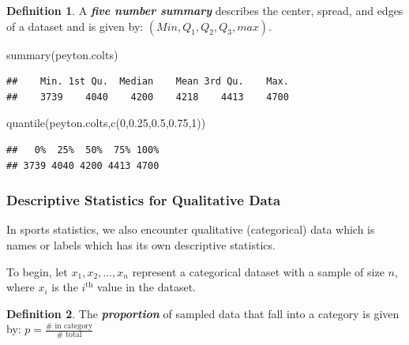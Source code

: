 \documentclass[
]{book}
\newenvironment{Shaded}{\begin{snugshade}}{\end{snugshade}}
\newcommand{\DecValTok}[1]{\textcolor[rgb]{0.00,0.00,0.81}{#1}}
\newcommand{\FloatTok}[1]{\textcolor[rgb]{0.00,0.00,0.81}{#1}}
\newcommand{\FunctionTok}[1]{\textcolor[rgb]{0.00,0.00,0.00}{#1}}
\newcommand{\NormalTok}[1]{#1}
\theoremstyle{definition}
\newtheorem{definition}{Definition}[chapter]
\theoremstyle{definition}
\theoremstyle{definition}
\theoremstyle{definition}
\theoremstyle{remark}
\begin{document}
\begin{definition}
A \textbf{\emph{five number summary}} describes the center, spread, and edges of a dataset and is given by: \((Min,Q_1,Q_2,Q_3,max)\).
\end{definition}

\begin{Shaded}
\begin{Highlighting}[]
\FunctionTok{summary}\NormalTok{(peyton.colts)}
\end{Highlighting}
\end{Shaded}

\begin{verbatim}
##    Min. 1st Qu.  Median    Mean 3rd Qu.    Max. 
##    3739    4040    4200    4218    4413    4700
\end{verbatim}

\begin{Shaded}
\begin{Highlighting}[]
\FunctionTok{quantile}\NormalTok{(peyton.colts,}\FunctionTok{c}\NormalTok{(}\DecValTok{0}\NormalTok{,}\FloatTok{0.25}\NormalTok{,}\FloatTok{0.5}\NormalTok{,}\FloatTok{0.75}\NormalTok{,}\DecValTok{1}\NormalTok{))}
\end{Highlighting}
\end{Shaded}

\begin{verbatim}
##   0%  25%  50%  75% 100% 
## 3739 4040 4200 4413 4700
\end{verbatim}

\hypertarget{descriptive-statistics-for-qualitative-data}{%
\subsubsection{Descriptive Statistics for Qualitative Data}\label{descriptive-statistics-for-qualitative-data}}

In sports statistics, we also encounter qualitative (categorical) data which is names or labels which has its own descriptive statistics.

To begin, let \(x_1, x_2, \ldots, x_n\) represent a categorical dataset with a sample of size \(n\), where \(x_i\) is the \(i^\text{th}\) value in the dataset.

\begin{definition}
The \textbf{\emph{proportion}} of sampled data that fall into a category is given by: \(p = \frac{\#\text{ in category}}{\#\text{ total}}\)
\end{definition}
\end{document}
